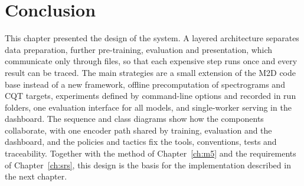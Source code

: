 \documentclass{FastFyp}
\begin{document}
\FloatBarrier
\section{Conclusion}
\label{sec:des-conclusion}
This chapter presented the design of the system. A layered architecture separates data preparation, further pre-training, evaluation and presentation, which communicate only through files, so that each expensive step runs once and every result can be traced. The main strategies are a small extension of the M2D code base instead of a new framework, offline precomputation of spectrograms and CQT targets, experiments defined by command-line options and recorded in run folders, one evaluation interface for all models, and single-worker serving in the dashboard. The sequence and class diagrams show how the components collaborate, with one encoder path shared by training, evaluation and the dashboard, and the policies and tactics fix the tools, conventions, tests and traceability. Together with the method of Chapter~\ref{ch:m5} and the requirements of Chapter~\ref{ch:srs}, this design is the basis for the implementation described in the next chapter.



{

}
\end{document}
